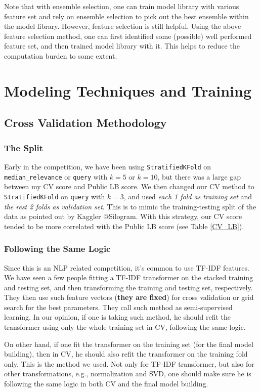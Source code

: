 \documentclass[12pt]{article}
\begin{document}
Note that with ensemble selection, one can train model library with various feature set and rely on ensemble selection to pick out the best ensemble within the model library. However, feature selection is still helpful. Using the above feature selection method, one can first identified some (possible) well performed feature set, and then trained model library with it. This helps to reduce the computation burden to some extent.

\section{Modeling Techniques and Training}
\subsection{Cross Validation Methodology}
\subsubsection{The Split}
Early in the competition, we have been using \texttt{StratifiedKFold} on \texttt{median\_relevance} or \texttt{query} with $k = 5$ or $k = 10$, but there was a large gap between my CV score and Public LB score. We then changed our CV method to \texttt{StratifiedKFold} on \texttt{query} with $k = 3$, and used \emph{each 1 fold as training set} and \emph{the rest 2 folds as validation set}. This is to mimic the training-testing split of the data as pointed out by Kaggler @Silogram. With this strategy, our CV score tended to be more correlated with the Public LB score (see Table \ref{CV_LB}).
\subsubsection{Following the Same Logic}
Since this is an NLP related competition, it's common to use TF-IDF features. We have seen a few people fitting a TF-IDF transformer on the stacked training and testing set, and then transforming the training and testing set, respectively. They then use such feature vectors (\textbf{they are fixed}) for cross validation or grid search for the best parameters. They call such method as semi-supervised learning. In our opinion, if one is taking such method, he should refit the transformer using only the whole training set in CV, following the same logic.

On other hand, if one fit the transformer on the training set (for the final model building), then in CV, he should also refit the transformer on the training fold only. This is the method we used. Not only for TF-IDF transformer, but also for other transformations, e.g., normalization and SVD, one should make sure he is following the same logic in both CV and the final model building.
\end{document}
